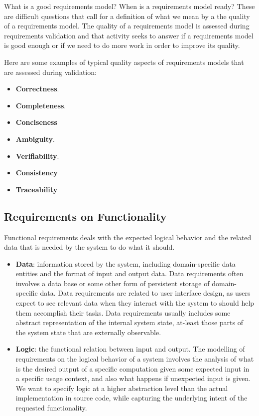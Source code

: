 What is a good requirements model? When is a requirements model ready? These are difficult questions that call for a definition of what we mean by a the quality of a requirements model. The quality of a requirements model is assessed during requirements validation and that activity seeks to answer if a requirements model is good enough or if we need to do more work in order to improve its quality.

Here are some examples of typical quality aspects of requirements models that are assessed during validation:
\begin{itemize}
  \item \textbf{Correctness}.
  \item \textbf{Completeness}.
  \item \textbf{Conciseness}
  \item \textbf{Ambiguity}.
  \item \textbf{Verifiability}.
  \item \textbf{Consistency}
  \item \textbf{Traceability}
\end{itemize}

\subsection{Requirements on Functionality}
Functional requirements deals with the expected logical behavior and the related data that is needed by the system to do what it should.
\begin{itemize}
  \item \textbf{Data}: information stored by the system, including domain-specific data entities and the format of input and output data. Data requirements often involves a data base or some other form of persistent storage of domain-specific data. Data requirements are related to user interface design, as users expect to see relevant data when they interact with the system to should help them accomplish their tasks. Data requirements usually includes some abstract representation of the internal system state, at-least those parts of the system state that are externally observable.
  \item \textbf{Logic}: the functional relation between input and output. The modelling of requirements on the logical behavior of a system involves the analysis of what is the desired output of a specific computation given some expected input in a specific usage context, and also what happens if unexpected input is given. We want to specify logic at a higher abstraction level than the actual implementation in source code, while capturing the underlying intent of the requested functionality. 
\end{itemize}

